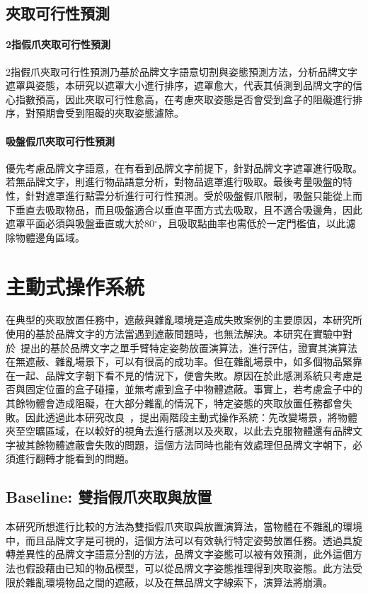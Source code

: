 \subsection{夾取可行性預測}
\paragraph{2指假爪夾取可行性預測}
2指假爪夾取可行性預測乃基於品牌文字語意切割與姿態預測方法，分析品牌文字遮罩與姿態，本研究以遮罩大小進行排序，遮罩愈大，代表其偵測到品牌文字的信心指數預高，因此夾取可行性愈高，在考慮夾取姿態是否會受到盒子的阻礙進行排序，對預期會受到阻礙的夾取姿態濾除。


\paragraph{吸盤假爪夾取可行性預測}
優先考慮品牌文字語意，在有看到品牌文字前提下，針對品牌文字遮罩進行吸取。若無品牌文字，則進行物品語意分析，對物品遮罩進行吸取。最後考量吸盤的特性，針對遮罩進行點雲分析進行可行性預測。受於吸盤假爪限制，吸盤只能從上而下垂直去吸取物品，而且吸盤適合以垂直平面方式去吸取，且不適合吸邊角，因此遮罩平面必須與吸盤垂直或大於80$^{\circ}$，且吸取點曲率也需低於一定門檻值，以此濾除物體邊角區域。



\section{主動式操作系統}
在典型的夾取放置任務中，遮蔽與雜亂環境是造成失敗案例的主要原因，本研究所使用的基於品牌文字的方法當遇到遮蔽問題時，也無法解決。本研究在實驗中對於~\cite{peterthesis}提出的基於品牌文字之單手臂特定姿勢放置演算法，進行評估，證實其演算法在無遮蔽、雜亂場景下，可以有很高的成功率。但在雜亂場景中，如多個物品緊靠在一起、品牌文字朝下看不見的情況下，便會失敗。原因在於此感測系統只考慮是否與固定位置的盒子碰撞，並無考慮到盒子中物體遮蔽。事實上，若考慮盒子中的其餘物體會造成阻礙，在大部分雜亂的情況下，特定姿態的夾取放置任務都會失敗。因此透過此本研究改良~\cite{peterthesis}，提出兩階段主動式操作系統：先改變場景，將物體夾至空曠區域，在以較好的視角去進行感測以及夾取，以此去克服物體還有品牌文字被其餘物體遮蔽會失敗的問題，這個方法同時也能有效處理但品牌文字朝下，必須進行翻轉才能看到的問題。


\subsection{Baseline: 雙指假爪夾取與放置}
本研究所想進行比較的方法為雙指假爪夾取與放置演算法，當物體在不雜亂的環境中，而且品牌文字是可視的，這個方法可以有效執行特定姿勢放置任務。透過具旋轉差異性的品牌文字語意分割的方法，品牌文字姿態可以被有效預測，此外這個方法也假設藉由已知的物品模型，可以從品牌文字姿態推理得到夾取姿態。此方法受限於雜亂環境物品之間的遮蔽，以及在無品牌文字線索下，演算法將崩潰。



